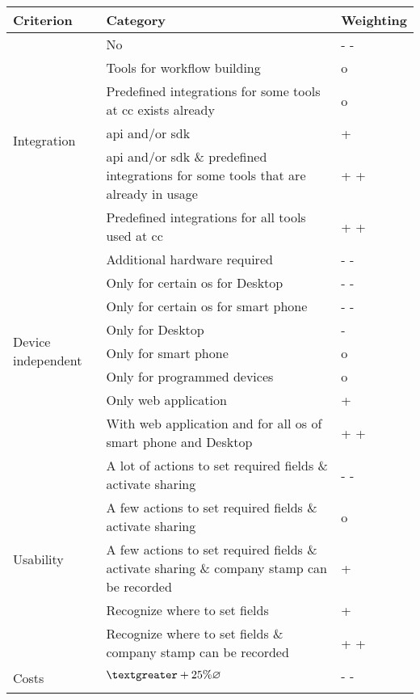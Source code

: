 	\begin{longtable}{|p{4cm}|p{9cm}|p{1.5cm}|} \hline
		Criterion & Category & Weighting \\ \hline
		\multirow{6}{*}{Integration} & No & - - \\ \cline{2-3}
									& Tools for workflow building & o \\ \cline{2-3}
									& Predefined integrations for some tools at \gls{cc} exists already & o \\ \cline{2-3}
									& \Gls{api} and/or \gls{sdk} & + \\ \cline{2-3}
									& \Gls{api} and/or \gls{sdk} \& predefined integrations for some tools that are already in usage & + + \\ \cline{2-3}
									& Predefined integrations for all tools used at \gls{cc} & + + \\ \hline 
		\multirow{8}{*}{Device independent} & Additional hardware required & - - \\ \cline{2-3}
											& Only for certain \gls{os} for Desktop & - - \\ \cline{2-3}
											& Only for certain \gls{os} for smart phone & - - \\ \cline{2-3} 
											& Only for Desktop & - \\ \cline{2-3}
											& Only for smart phone & o \\ \cline{2-3}
											& Only for programmed devices & o \\ \cline{2-3}
											& Only web application & + \\ \cline{2-3}
											& With web application and for all \gls{os} of smart phone and Desktop & + + \\ \hline
		\multirow{5}{*}{Usability} & A lot of actions to set required fields \& activate sharing & - - \\ \cline{2-3}
								    & A few actions to set required fields \& activate sharing & o \\ \cline{2-3}
									& A few actions to set required fields \& activate sharing \& company stamp can be recorded & + \\ \cline{2-3}
									& Recognize where to set fields & + \\ \cline{2-3}
									& Recognize where to set fields \& company stamp can be recorded & + + \\ \hline
		\multirow{5}{*}{Costs}  & $ \textgreater +25\% \varnothing $ & - - \\ \cline{2-3}

\end{longtable}
